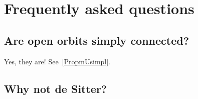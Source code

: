 %
   \section{Frequently asked questions}
%

\subsection{Are open orbits simply connected?}

Yes, they are! See~\ref{PropmUsimpl}.

\subsection{Why not de Sitter?}
